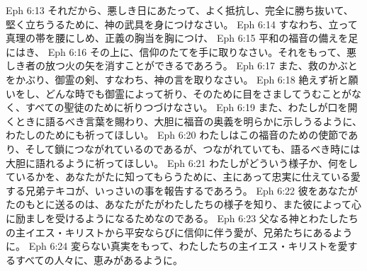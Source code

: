 Eph 6:13  それだから、悪しき日にあたって、よく抵抗し、完全に勝ち抜いて、堅く立ちうるために、神の武具を身につけなさい。
Eph 6:14  すなわち、立って真理の帯を腰にしめ、正義の胸当を胸につけ、
Eph 6:15  平和の福音の備えを足にはき、
Eph 6:16  その上に、信仰のたてを手に取りなさい。それをもって、悪しき者の放つ火の矢を消すことができるであろう。
Eph 6:17  また、救のかぶとをかぶり、御霊の剣、すなわち、神の言を取りなさい。
Eph 6:18  絶えず祈と願いをし、どんな時でも御霊によって祈り、そのために目をさましてうむことがなく、すべての聖徒のために祈りつづけなさい。
Eph 6:19  また、わたしが口を開くときに語るべき言葉を賜わり、大胆に福音の奥義を明らかに示しうるように、わたしのためにも祈ってほしい。
Eph 6:20  わたしはこの福音のための使節であり、そして鎖につながれているのであるが、つながれていても、語るべき時には大胆に語れるように祈ってほしい。
Eph 6:21  わたしがどういう様子か、何をしているかを、あなたがたに知ってもらうために、主にあって忠実に仕えている愛する兄弟テキコが、いっさいの事を報告するであろう。
Eph 6:22  彼をあなたがたのもとに送るのは、あなたがたがわたしたちの様子を知り、また彼によって心に励ましを受けるようになるためなのである。
Eph 6:23  父なる神とわたしたちの主イエス・キリストから平安ならびに信仰に伴う愛が、兄弟たちにあるように。
Eph 6:24  変らない真実をもって、わたしたちの主イエス・キリストを愛するすべての人々に、恵みがあるように。


